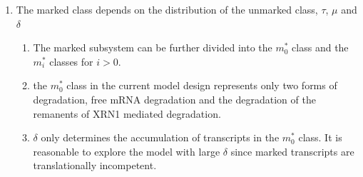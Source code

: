 \documentclass[review]{elsarticle}
\begin{document}
\begin{enumerate}
	\item The marked class depends on the distribution of the unmarked class, $\tau$, $\mu$ and $\delta$
	\begin{enumerate}
		\item The marked subsystem can be further divided into the $m_0^*$ class and the $m_i^*$ classes for $i>0$.
		\item the $m_0^*$  class in the current model design represents only two forms of degradation, free mRNA degradation and the degradation of the remanents of XRN1 mediated degradation.%
		\item  $\delta$ only determines the accumulation of transcripts in the  $m_0^*$  class. It is reasonable to explore the model with   large $\delta$ since marked transcripts are translationally incompetent. %

		
	\end{enumerate}

		




	

%



\end{enumerate}
\end{document}

